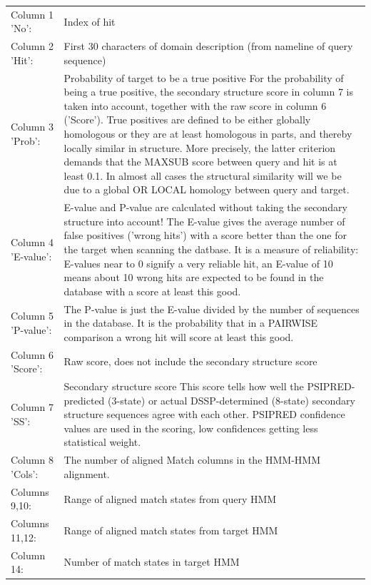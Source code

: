 \documentclass[11pt,a4paper]{article}
\begin{document}
\renewcommand{\arraystretch}{1.2}
\begin{longtable}{lp{110mm}}
Column 1 'No': & Index of hit\\

Column 2 'Hit': & First 30 characters of domain description (from nameline of query sequence)\\

Column 3 'Prob': & Probability of target to be a true positive
For the probability of being a true positive, the secondary structure score 
in column 7 is taken into account, together with the raw score in column 6 ('Score'). 
True positives are defined to be either globally homologous or they are at least 
homologous in parts, and thereby locally similar in structure. More precisely, 
the latter criterion demands that the MAXSUB score between query and hit is at 
least 0.1. In almost all cases the structural similarity will we be due to a global
OR LOCAL homology between query and target. \\

Column 4 'E-value': & 
E-value and P-value are calculated without taking the secondary structure into account!
The E-value gives the average number of false positives ('wrong hits') with a score 
better than the one for the target when scanning the datbase. It is a measure of 
reliability: E-values near to 0 signify a very reliable hit, an E-value of 10 means 
about 10 wrong hits are expected to be found in the database with a score at least 
this good.\\

Column 5 'P-value': & 
The P-value is just the E-value divided by the number of sequences in the database.
It is the probability that in a PAIRWISE comparison a wrong hit will score at least 
this good.\\

Column 6 'Score': & Raw score, does not include the secondary structure score\\

Column 7 'SS':    & Secondary structure score
This score tells how well the PSIPRED-predicted (3-state) or actual DSSP-determined 
(8-state) secondary structure sequences agree with each other. PSIPRED confidence 
values are used in the scoring, low confidences getting less statistical weight.\\

Column 8 'Cols': & The number of aligned Match columns in the HMM-HMM alignment.\\

Columns 9,10: &  Range of aligned match states from query HMM\\

Columns 11,12: & Range of aligned match states from target HMM\\
Column 14: & Number of match states in target HMM\\
\end{longtable}
\end{document}
